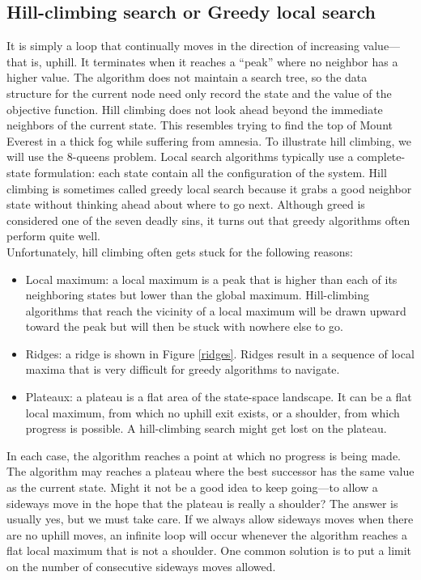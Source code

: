 \subsection{Hill-climbing search or Greedy local search}
It is simply a loop that continually moves in the direction of increasing value—that is, uphill. It
terminates when it reaches a “peak” where no neighbor has a higher value. The algorithm
does not maintain a search tree, so the data structure for the current node need only record
the state and the value of the objective function. Hill climbing does not look ahead beyond
the immediate neighbors of the current state. This resembles trying to find the top of Mount
Everest in a thick fog while suffering from amnesia.
To illustrate hill climbing, we will use the 8-queens problem.
Local search algorithms typically use a complete-state formulation: each state contain all the configuration of the system. Hill climbing is sometimes called greedy local search because it grabs a good neighbor state without thinking ahead about where to go next. Although greed is considered one of the seven deadly sins, it turns out that greedy algorithms often perform quite well.
\\
Unfortunately, hill climbing often gets stuck for the following reasons:
\begin{itemize}
\item Local maximum: a local maximum is a peak that is higher than each of its neighboring
states but lower than the global maximum. Hill-climbing algorithms that reach the
vicinity of a local maximum will be drawn upward toward the peak but will then be
stuck with nowhere else to go.
\item Ridges: a ridge is shown in Figure \ref{ridges}. Ridges result in a sequence of local maxima
that is very difficult for greedy algorithms to navigate.
\item Plateaux: a plateau is a flat area of the state-space landscape. It can be a flat local maximum, from which no uphill exit exists, or a shoulder, from which progress is possible. A hill-climbing search might get lost on the plateau.
\end{itemize}
In each case, the algorithm reaches a point at which no progress is being made.
The algorithm may reaches a plateau where the best successor has the same value as the current state. Might it not be a good idea to keep going—to allow a
sideways move in the hope that the plateau is really a shoulder? The answer is usually yes, but we must take care. If we always allow sideways moves when there are no uphill moves, an infinite loop will occur whenever the algorithm reaches a flat local maximum that is not a shoulder. One common solution is to put a limit on the number of consecutive sideways moves allowed.
